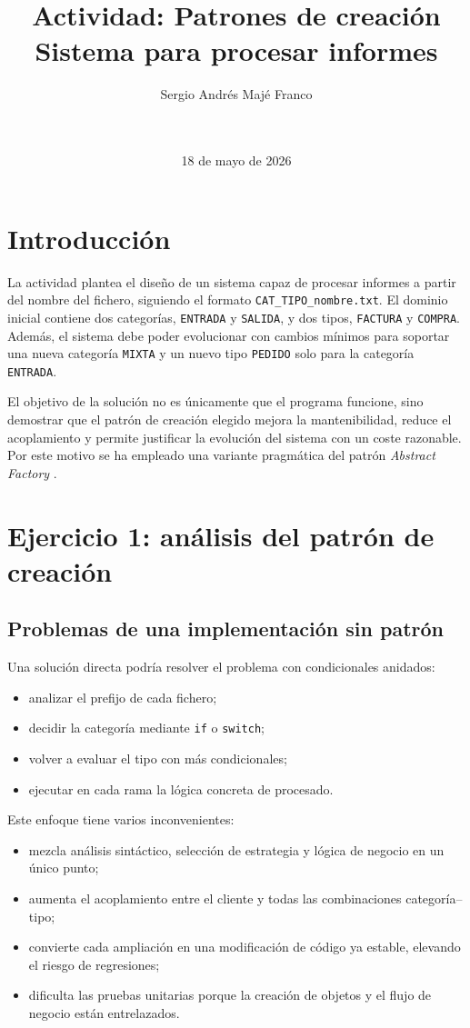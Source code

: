 \documentclass[12pt]{article}
\title{\textbf{Actividad: Patrones de creación}\\Sistema para procesar informes}
\author{Sergio Andrés Majé Franco}
\date{\Asignatura \\ \Universidad \\ 18 de mayo de 2026}
\begin{document}
\maketitle
\tableofcontents
\newpage

\section{Introducción}
La actividad plantea el diseño de un sistema capaz de procesar informes a partir del nombre del fichero, siguiendo el formato \texttt{CAT\_TIPO\_nombre.txt}. El dominio inicial contiene dos categorías, \texttt{ENTRADA} y \texttt{SALIDA}, y dos tipos, \texttt{FACTURA} y \texttt{COMPRA}. Además, el sistema debe poder evolucionar con cambios mínimos para soportar una nueva categoría \texttt{MIXTA} y un nuevo tipo \texttt{PEDIDO} solo para la categoría \texttt{ENTRADA}.

El objetivo de la solución no es únicamente que el programa funcione, sino demostrar que el patrón de creación elegido mejora la mantenibilidad, reduce el acoplamiento y permite justificar la evolución del sistema con un coste razonable. Por este motivo se ha empleado una variante pragmática del patrón \emph{Abstract Factory} \cite{gamma1994design}.

\section{Ejercicio 1: análisis del patrón de creación}
\subsection{Problemas de una implementación sin patrón}
Una solución directa podría resolver el problema con condicionales anidados:

\begin{itemize}[leftmargin=*]
  \item analizar el prefijo de cada fichero;
  \item decidir la categoría mediante \texttt{if} o \texttt{switch};
  \item volver a evaluar el tipo con más condicionales;
  \item ejecutar en cada rama la lógica concreta de procesado.
\end{itemize}

Este enfoque tiene varios inconvenientes:

\begin{itemize}[leftmargin=*]
  \item mezcla análisis sintáctico, selección de estrategia y lógica de negocio en un único punto;
  \item aumenta el acoplamiento entre el cliente y todas las combinaciones categoría--tipo;
  \item convierte cada ampliación en una modificación de código ya estable, elevando el riesgo de regresiones;
  \item dificulta las pruebas unitarias porque la creación de objetos y el flujo de negocio están entrelazados.
\end{itemize}
\end{document}

